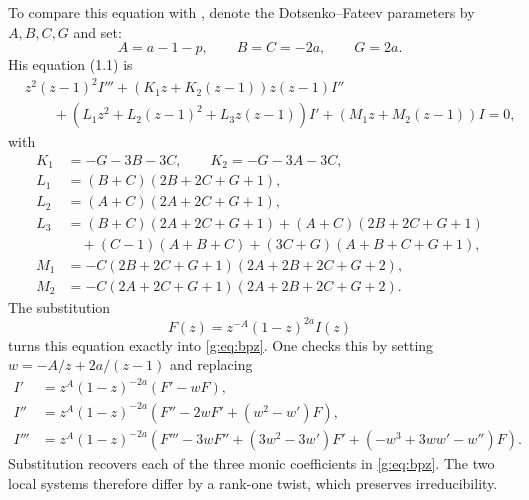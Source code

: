 \documentclass[11pt,a4paper]{article}
\numberwithin{equation}{section}
\theoremstyle{definition}\newtheorem{definition}[theorem]{Definition}
\theoremstyle{remark}\newtheorem{remark}[theorem]{Remark}
\begin{document}
To compare this equation with \cite[equation (1.1)]{mimachi},
denote the Dotsenko--Fateev parameters by $A,B,C,G$ and set:
\[
 A=a-1-p,\qquad B=C=-2a,\qquad G=2a.
\]
His equation (1.1) is
\begin{align*}
 &z^2(z-1)^2I'''+(K_1z+K_2(z-1))z(z-1)I''\\
 &\qquad +(L_1z^2+L_2(z-1)^2+L_3z(z-1))I'
 +(M_1z+M_2(z-1))I=0,
\end{align*}
with
\begin{align*}
 K_1&=-G-3B-3C,\qquad K_2=-G-3A-3C,\\
 L_1&=(B+C)(2B+2C+G+1),\\
 L_2&=(A+C)(2A+2C+G+1),\\
 L_3&=(B+C)(2A+2C+G+1)+(A+C)(2B+2C+G+1)\\
    &\quad +(C-1)(A+B+C)+(3C+G)(A+B+C+G+1),\\
 M_1&=-C(2B+2C+G+1)(2A+2B+2C+G+2),\\
 M_2&=-C(2A+2C+G+1)(2A+2B+2C+G+2).
\end{align*}
The substitution
\[
 F(z)=z^{-A}(1-z)^{2a}I(z)
\]
turns this equation exactly into \eqref{g:eq:bpz}. One checks this by setting
$w=-A/z+2a/(z-1)$ and replacing
\begin{align*}
 I'&=z^A(1-z)^{-2a}(F'-wF),\\
 I''&=z^A(1-z)^{-2a}(F''-2wF'+(w^2-w')F),\\
 I'''&=z^A(1-z)^{-2a}
  (F'''-3wF''+(3w^2-3w')F'+(-w^3+3ww'-w'')F).
\end{align*}
Substitution recovers each of the three monic coefficients in
\eqref{g:eq:bpz}.  The two local systems therefore differ by a
rank-one twist, which preserves irreducibility.
\end{document}

